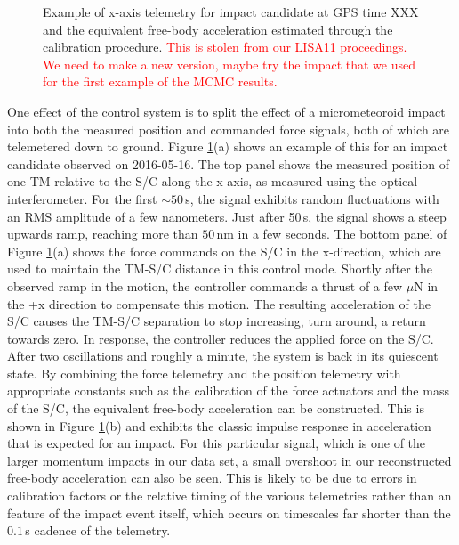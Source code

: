 \documentclass[preprint, trackchanges]{aastex61}
\newcommand{\red}[1]{\textcolor{red}{#1}}
\begin{document}
\begin{figure}
\caption{Example of x-axis telemetry for impact candidate at GPS time XXX and the equivalent free-body acceleration estimated through the calibration procedure.\label{fig:models} \red{This is stolen from our LISA11 proceedings. We need to make a new version, maybe try the impact that we used for the first example of the MCMC results.}}
\end{figure}

One effect of the control system is to split the effect of a micrometeoroid impact into both the measured position and commanded force signals, both of which are telemetered down to ground. Figure \ref{fig:models}(a) shows an example of this for an impact candidate observed on 2016-05-16.  The top panel shows the measured position of one TM relative to the S/C along the x-axis, as measured using the optical interferometer.  For the first $\sim50\,$s, the signal exhibits random fluctuations with an RMS amplitude of a few nanometers. Just after 50$\,$s, the signal shows a steep upwards ramp, reaching more than $50\,$nm in a few seconds.  The bottom panel of Figure \ref{fig:models}(a) shows the force commands on the S/C in the x-direction, which are used to maintain the TM-S/C distance in this control mode. Shortly after the observed ramp in the motion, the controller commands a thrust of a few $\mu$N in the +x direction to compensate this motion.  The resulting acceleration of the S/C causes the TM-S/C separation to stop increasing, turn around, a return towards zero. In response, the controller reduces the applied force on the S/C. After two oscillations and roughly a minute, the system is back in its quiescent state.  By combining the force telemetry and the position telemetry with appropriate constants such as the calibration of the force actuators and the mass of the S/C, the equivalent free-body acceleration can be constructed. This is shown in Figure \ref{fig:models}(b) and exhibits the classic impulse response in acceleration that is expected for an impact. For this particular signal, which is one of the larger momentum impacts in our data set, a small overshoot in our reconstructed free-body acceleration can also be seen. This is likely to be due to errors in calibration factors or the relative timing of the various telemetries rather than an feature of the impact event itself, which occurs on timescales far shorter than the $0.1\,$s cadence of the telemetry. 
\end{document}
